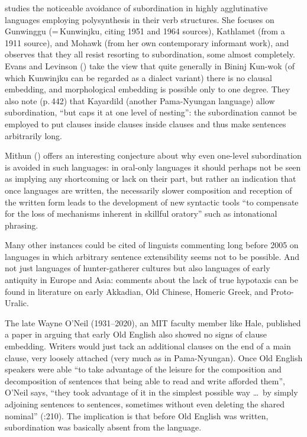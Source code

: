 \documentclass[output=paper,colorlinks,citecolor=brown
]{langscibook}
\begin{document}
\citet{Mithun84} studies the noticeable avoidance of subordination
in highly agglutinative languages employing polysynthesis in their
verb structures. She focuses on Gunwinggu (=\,Kunwinjku, citing 1951
and 1964 sources), Kathlamet (from a 1911 source), and Mohawk (from
her own contemporary informant work), and observes that they all
resist resorting to subordination, some almost completely. Evans and
Levinson (\citeyear[Section~6]{EvanLevi09}) take the view that quite
generally in Bininj Kun-wok (of which Kunwinjku can be regarded as a
dialect variant) there is no clausal embedding, and morphological
embedding is possible only to one degree. They also note (p.\,442)
that Kayardild (another Pama-Nyungan language) allow subordination,
``but caps it at one level of nesting'': the subordination cannot be
employed to put clauses inside clauses inside clauses and thus make
sentences arbitrarily long.

Mithun (\citeyear[509]{Mithun84}) offers an interesting conjecture
about why even one-level subordination is avoided in such languages:
in oral-only languages it should perhaps not be seen as implying any
shortcoming or lack on their part, but rather an indication that once
languages are written, the necessarily slower composition and reception
of the written form leads to the development of new syntactic tools
``to compensate for the loss of mechanisms inherent in skillful oratory''
such as intonational phrasing.

Many other instances could be cited of linguists commenting long before
2005 on languages in which arbitrary sentence extensibility seems not
to be possible. And not just languages of hunter-gatherer cultures
but also languages of early antiquity in Europe and Asia: comments
about the lack of true hypotaxis can be found in literature on
early Akkadian, Old Chinese, Homeric Greek, and Proto-Uralic.

The late Wayne O'Neil (1931--2020), an MIT faculty member like Hale,
published a paper in \citeyear{ONeil77} arguing that early Old English
also showed no signs of clause embedding. Writers would just tack an
additional clauses on the end of a main clause, very loosely attached
(very much as in Pama-Nyungan). Once Old English speakers were able
``to take advantage of the leisure for the composition and decomposition
of sentences that being able to read and write afforded them'', O'Neil
says, ``they took advantage of it in the simplest possible way \ldots\
by simply adjoining sentences to sentences, sometimes without even
deleting the shared nominal'' (\citealt{ONeil77}:210). The implication
is that before Old English was written, subordination was basically
absent from the language.\label{page-non-infinite-languages-end}
\end{document}
